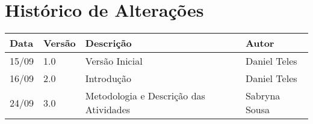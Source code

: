 \chapter*{Histórico de Alterações}

\begin{table}[!htpd]
\centering
\label{my-label}
\begin{tabular}{|l|l|l|l|}
\hline
\textbf{Data} & \textbf{Versão} & \textbf{Descrição} & \textbf{Autor} \\ \hline
15/09         & 1.0             & Versão Inicial     & Daniel Teles   \\ \hline
16/09         & 2.0             & Introdução         & Daniel Teles   \\ \hline
24/09         & 3.0             & Metodologia e Descrição das Atividades       & Sabryna Sousa  \\ \hline
\end{tabular}
\end{table}

\cleardoublepage
